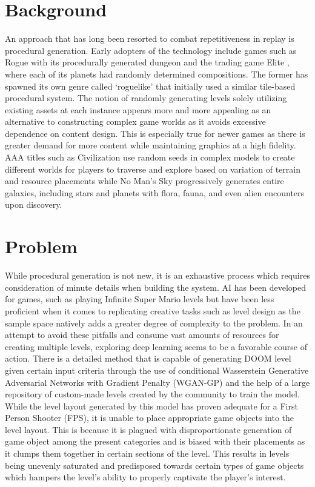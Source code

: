\documentclass{Configuration_Files/PoliMi3i_thesis}
\begin{document}
\section{Background}
\label{sec:background}
An approach that has long been resorted to combat repetitiveness in replay is 
procedural generation. Early adopters of the technology include games such as 
Rogue \cite{MiT80} with its procedurally generated dungeon and the trading game Elite \cite{DaB84}, 
where each of its planets had randomly determined compositions. The former has 
spawned its own genre called ‘roguelike’ that initially used a similar tile-based 
procedural system. The notion of randomly generating levels solely utilizing existing 
assets at each instance appears more and more appealing as an alternative to 
constructing complex game worlds as it avoids excessive dependence on content 
design. This is especially true for newer games as there is greater demand for more 
content while maintaining graphics at a high fidelity. AAA titles such as Civilization 
\cite{MiP96} use random seeds in complex models to create different worlds for players to 
traverse and explore based on variation of terrain and resource placements while No Man’s Sky 
\cite{HaG16} progressively generates entire galaxies, including stars and planets with flora, 
fauna, and even alien encounters upon discovery.

\section{Problem}
\label{sec:problem}
While procedural generation is not new, it is an exhaustive process which requires 
consideration of minute details when building the system. AI has been developed for 
games, such as playing Infinite Super Mario levels \cite{KaS12} but have been less proficient 
when it comes to replicating creative tasks such as level design as the sample space natively 
adds a greater degree of complexity to the problem. In an attempt to avoid these 
pitfalls and consume vast amounts of resources for creating multiple levels, 
exploring deep learning seems to be a favorable course of action. There is a detailed 
method that is capable of generating DOOM level given certain input criteria 
through the use of conditional Wasserstein Generative Adversarial Networks with Gradient Penalty 
(WGAN-GP) \cite{MaA17} and the help of a large 
repository of custom-made levels created by the community to train the model. 
While the level layout generated by this model has proven adequate for a  
First Person Shooter (FPS), it is unable to place appropriate game objects into the level layout. 
This is because it is plagued with disproportionate generation of game object among the present 
categories and is biased with their placements as it clumps them together in certain sections of the 
level. This results in levels being unevenly saturated and predisposed towards certain types of 
game objects which hampers the level’s ability to properly captivate the player’s 
interest.
\end{document}
